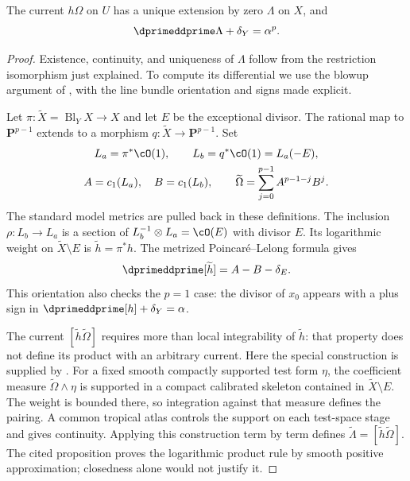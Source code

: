 \begin{theorem}\label{thm:cld-levine}
The current $h\Omega$ on $U$ has a unique extension by zero $\Lambda$ on
$X$, and
\[
                       \dprimeddprime\Lambda+\delta_Y=\alpha^p.
\]
\end{theorem}
\begin{proof}
Existence, continuity, and uniqueness of $\Lambda$ follow from the
restriction isomorphism just explained.  To compute its differential we
use the blowup argument of \cite[Theorem~18.7.5]{CLD25}, with the line
bundle orientation and signs made explicit.

Let $\pi:\widetilde X=\operatorname{Bl}_Y X\to X$ and let $E$ be the
exceptional divisor.  The rational map to $\mathbf P^{p-1}$ extends to a
morphism $q:\widetilde X\to\mathbf P^{p-1}$.  Set
\[
 \begin{gathered}
 L_a=\pi^*\cO(1),\qquad L_b=q^*\cO(1)=L_a(-E),\\
 A=c_1(L_a),\quad B=c_1(L_b),\qquad
 \widetilde\Omega=\sum_{j=0}^{p-1}A^{p-1-j}B^j.
 \end{gathered}
\]
The standard model metrics are pulled back in these definitions.
The inclusion $\rho:L_b\to L_a$ is a section of
$L_b^{-1}\otimes L_a=\cO(E)$ with divisor $E$.  Its logarithmic weight on
$\widetilde X\setminus E$ is $\widetilde h=\pi^*h$.  The metrized
Poincar\'e--Lelong formula gives
\begin{equation}\label{eq:levine-blowup-ddc}
 \dprimeddprime[\widetilde h]=A-B-\delta_E.
\end{equation}
This orientation also checks the $p=1$ case: the divisor of $x_0$ appears
with a plus sign in $\dprimeddprime[h]+\delta_Y=\alpha$.

The current $[\widetilde h\widetilde\Omega]$ requires more than local
integrability of $\widetilde h$: that property does not define its product
with an arbitrary current.  Here the special construction is supplied by
\cite[Lemma~18.3.8 and Proposition~18.3.9]{CLD25}.  For a fixed smooth
compactly supported test form $\eta$, the coefficient measure
$\widetilde\Omega\wedge\eta$ is supported in a compact calibrated
skeleton contained in $\widetilde X\setminus E$.  The weight is bounded
there, so integration against that measure defines the pairing.  A common
tropical atlas controls the support on each test-space stage and gives
continuity.  Applying this construction term by term defines
$\widetilde\Lambda=[\widetilde h\widetilde\Omega]$.  The cited
proposition proves the logarithmic product rule by smooth positive
approximation; closedness alone would not justify it.


\end{proof}

